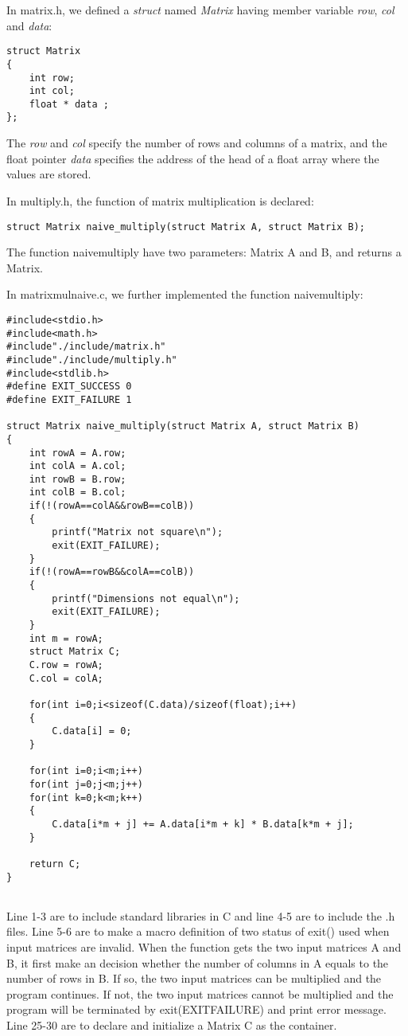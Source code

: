 \documentclass[12pt]{article}
\begin{document}
	In matrix.h, we defined a \textit{struct} named \textit{Matrix} having member variable \textit{row}, \textit{col} and \textit{data}:
	\begin{lstlisting}[title=Matrix.h]
struct Matrix
{
	int row;
	int col;
	float * data ;
};
	\end{lstlisting}\par
	The \textit{row} and \textit{col} specify the number of rows and columns of a matrix, and the float pointer \textit{data} specifies the address of the head of a float array where the values are stored.\\\par
	In multiply.h, the function of matrix multiplication is declared:
	\begin{lstlisting}[title = multiply.h]
struct Matrix naive_multiply(struct Matrix A, struct Matrix B);
	\end{lstlisting}\par
	The function naive\underline{\:}multiply have two parameters: Matrix A and B, and returns a Matrix.\\\par
	In matrix\underline{\:}mul\underline{\:}naive.c, we further implemented the function naive\underline{\:}multiply:
	\begin{lstlisting}[title=matrix\underline{\:}mul\underline{\:}naive.c]
#include<stdio.h>
#include<math.h>
#include"./include/matrix.h"
#include"./include/multiply.h"
#include<stdlib.h>
#define EXIT_SUCCESS 0
#define EXIT_FAILURE 1

struct Matrix naive_multiply(struct Matrix A, struct Matrix B)
{
	int rowA = A.row;
	int colA = A.col;
	int rowB = B.row;
	int colB = B.col;
	if(!(rowA==colA&&rowB==colB))
	{
		printf("Matrix not square\n");
		exit(EXIT_FAILURE);
	}
	if(!(rowA==rowB&&colA==colB))
	{
		printf("Dimensions not equal\n");
		exit(EXIT_FAILURE);
	}
	int m = rowA;
	struct Matrix C;
	C.row = rowA;
	C.col = colA;
	
	for(int i=0;i<sizeof(C.data)/sizeof(float);i++)
	{
		C.data[i] = 0;
	}
	
	for(int i=0;i<m;i++)
	for(int j=0;j<m;j++)
	for(int k=0;k<m;k++)
	{
		C.data[i*m + j] += A.data[i*m + k] * B.data[k*m + j];
	}
	
	return C;
}


	\end{lstlisting} 
	\par
	Line 1-3 are to include standard libraries in C and line 4-5 are to include the .h files. Line 5-6 are to make a macro definition of two status of exit() used when input matrices are invalid. When the function gets the two input matrices A and B, it first make an decision whether the number of columns in A equals to the number of rows in B. If so, the two input matrices can be multiplied and the program continues. If not, the two input matrices cannot be multiplied and the program will be terminated by exit(EXIT\underline{\:}FAILURE) and print error message. Line 25-30 are to declare and initialize a Matrix C as the container. 
\end{document}
